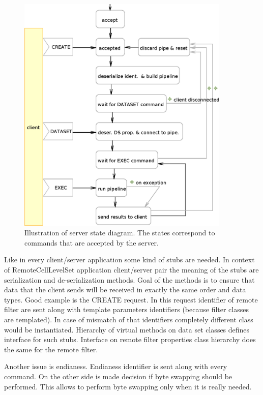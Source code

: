 \begin{figure}
    \centering
    \includegraphics[width=0.9\textwidth]{data/RCServerCycle}
    \caption[MedV4D server cycle]
{
Illustration of server state diagram.
The states correspond to commands that are accepted by the server.
}
    \label{fg:RCServerCycle}
\end{figure}

Like in every client/server application some kind of stubs are needed.
In context of RemoteCellLevelSet application client/server pair the meaning of the stubs are serialization and de-serialization methods.
Goal of the methods is to ensure that data that the client sends will be received in exactly the same order and data types.
Good example is the CREATE request.
In this request identifier of remote filter are sent along with template parameters identifiers (because filter classes are templated).
In case of mismatch of that identifiers completely different class would be instantiated.
Hierarchy of virtual methods on data set classes defines interface for such stubs.
Interface on remote filter properties class hierarchy does the same for the remote filter.

Another issue is endianess.
Endianess identifier is sent along with every command. On the other side is made decision if byte swapping should be performed.
This allows to perform byte swapping only when it is really needed.

